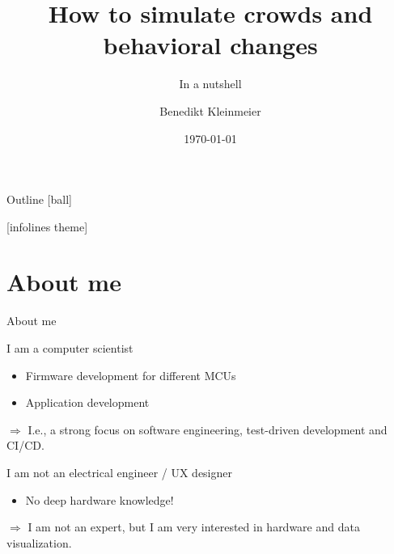 \documentclass[compress,t,usenames,xcolor=dvipsnames]{beamer}
\title{How to simulate crowds and behavioral changes}
\subtitle{In a nutshell}
\author{Benedikt Kleinmeier}
\institute{}
\date{\today}
\begin{document}
\begin{frame}[plain]
\titlepage

\end{frame}

\begin{frame}[c]{Outline}
    [ball]
    \tableofcontents[hideallsubsections]
\end{frame}
[infolines theme]

\section{About me}

\begin{frame}{About me}
    \begin{block}{\alert{I am} a computer scientist}
        \begin{itemize}
            \item Firmware development for different MCUs
            \item Application development
        \end{itemize}
        \(\Rightarrow\) I.e., a strong focus on software engineering, test-driven development and CI/CD.
    \end{block}
    \begin{block}{\alert{I am not} an electrical engineer / UX designer}
        \begin{itemize}
            \item No deep hardware knowledge!
        \end{itemize}
        \(\Rightarrow\) I am not an expert, but I am very interested in hardware and data visualization.
    \end{block}
\end{frame}
\end{document}
